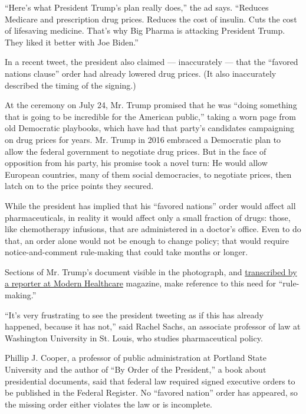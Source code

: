 ``Here's what President Trump's plan really does,'' the ad says.
``Reduces Medicare and prescription drug prices. Reduces the cost of
insulin. Cuts the cost of lifesaving medicine. That's why Big Pharma is
attacking President Trump. They liked it better with Joe Biden.''

In a recent tweet, the president also claimed --- inaccurately --- that
the ``favored nations clause'' order had already lowered drug prices.
(It also inaccurately described the timing of the signing.)

At the ceremony on July 24, Mr. Trump promised that he was ``doing
something that is going to be incredible for the American public,''
taking a worn page from old Democratic playbooks, which have had that
party's candidates campaigning on drug prices for years. Mr. Trump in
2016 embraced a Democratic plan to allow the federal government to
negotiate drug prices. But in the face of opposition from his party, his
promise took a novel turn: He would allow European countries, many of
them social democracies, to negotiate prices, then latch on to the price
points they secured.

While the president has implied that his ``favored nations'' order would
affect all pharmaceuticals, in reality it would affect only a small
fraction of drugs: those, like chemotherapy infusions, that are
administered in a doctor's office. Even to do that, an order alone would
not be enough to change policy; that would require notice-and-comment
rule-making that could take months or longer.

Sections of Mr. Trump's document visible in the photograph, and
\href{https://www.modernhealthcare.com/politics-policy/heres-peek-white-houses-unreleased-drug-pricing-order}{transcribed
by a reporter at Modern Healthcare} magazine, make reference to this
need for ``rule-making.''

``It's very frustrating to see the president tweeting as if this has
already happened, because it has not,'' said Rachel Sachs, an associate
professor of law at Washington University in St. Louis, who studies
pharmaceutical policy.

Phillip J. Cooper, a professor of public administration at Portland
State University and the author of ``By Order of the President,'' a book
about presidential documents, said that federal law required signed
executive orders to be published in the Federal Register. No ``favored
nation'' order has appeared, so the missing order either violates the
law or is incomplete.

